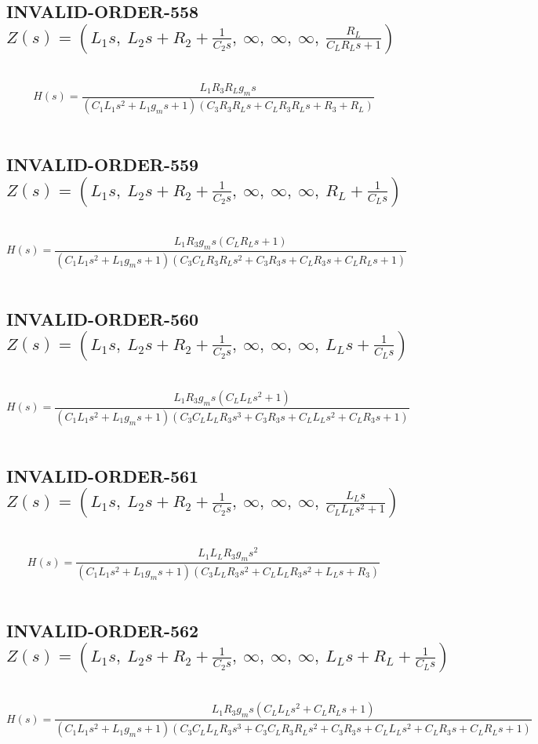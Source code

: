 \documentclass{article}
\begin{document}
\subsection{INVALID-ORDER-558 $Z(s) = \left( L_{1} s, \  L_{2} s + R_{2} + \frac{1}{C_{2} s}, \  \infty, \  \infty, \  \infty, \  \frac{R_{L}}{C_{L} R_{L} s + 1}\right)$ } \ 
\textbf{\[H(s) = \frac{L_{1} R_{3} R_{L} g_{m} s}{\left(C_{1} L_{1} s^{2} + L_{1} g_{m} s + 1\right) \left(C_{3} R_{3} R_{L} s + C_{L} R_{3} R_{L} s + R_{3} + R_{L}\right)}\] } \ 
\subsection{INVALID-ORDER-559 $Z(s) = \left( L_{1} s, \  L_{2} s + R_{2} + \frac{1}{C_{2} s}, \  \infty, \  \infty, \  \infty, \  R_{L} + \frac{1}{C_{L} s}\right)$ } \ 
\textbf{\[H(s) = \frac{L_{1} R_{3} g_{m} s \left(C_{L} R_{L} s + 1\right)}{\left(C_{1} L_{1} s^{2} + L_{1} g_{m} s + 1\right) \left(C_{3} C_{L} R_{3} R_{L} s^{2} + C_{3} R_{3} s + C_{L} R_{3} s + C_{L} R_{L} s + 1\right)}\] } \ 
\subsection{INVALID-ORDER-560 $Z(s) = \left( L_{1} s, \  L_{2} s + R_{2} + \frac{1}{C_{2} s}, \  \infty, \  \infty, \  \infty, \  L_{L} s + \frac{1}{C_{L} s}\right)$ } \ 
\textbf{\[H(s) = \frac{L_{1} R_{3} g_{m} s \left(C_{L} L_{L} s^{2} + 1\right)}{\left(C_{1} L_{1} s^{2} + L_{1} g_{m} s + 1\right) \left(C_{3} C_{L} L_{L} R_{3} s^{3} + C_{3} R_{3} s + C_{L} L_{L} s^{2} + C_{L} R_{3} s + 1\right)}\] } \ 
\subsection{INVALID-ORDER-561 $Z(s) = \left( L_{1} s, \  L_{2} s + R_{2} + \frac{1}{C_{2} s}, \  \infty, \  \infty, \  \infty, \  \frac{L_{L} s}{C_{L} L_{L} s^{2} + 1}\right)$ } \ 
\textbf{\[H(s) = \frac{L_{1} L_{L} R_{3} g_{m} s^{2}}{\left(C_{1} L_{1} s^{2} + L_{1} g_{m} s + 1\right) \left(C_{3} L_{L} R_{3} s^{2} + C_{L} L_{L} R_{3} s^{2} + L_{L} s + R_{3}\right)}\] } \ 
\subsection{INVALID-ORDER-562 $Z(s) = \left( L_{1} s, \  L_{2} s + R_{2} + \frac{1}{C_{2} s}, \  \infty, \  \infty, \  \infty, \  L_{L} s + R_{L} + \frac{1}{C_{L} s}\right)$ } \ 
\textbf{\[H(s) = \frac{L_{1} R_{3} g_{m} s \left(C_{L} L_{L} s^{2} + C_{L} R_{L} s + 1\right)}{\left(C_{1} L_{1} s^{2} + L_{1} g_{m} s + 1\right) \left(C_{3} C_{L} L_{L} R_{3} s^{3} + C_{3} C_{L} R_{3} R_{L} s^{2} + C_{3} R_{3} s + C_{L} L_{L} s^{2} + C_{L} R_{3} s + C_{L} R_{L} s + 1\right)}\] } \ 
\end{document}
